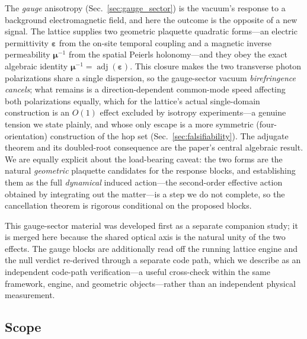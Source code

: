 The \emph{gauge} anisotropy (Sec.~\ref{sec:gauge_sector}) is the vacuum's response to
a background electromagnetic field, and here the outcome is the opposite of a new
signal. The lattice supplies two geometric plaquette quadratic forms---an electric
permittivity $\boldsymbol{\varepsilon}$ from the on-site temporal coupling and a
magnetic inverse permeability $\boldsymbol{\mu}^{-1}$ from the spatial Peierls
holonomy---and they obey the exact algebraic identity $\boldsymbol{\mu}^{-1} =
\operatorname{adj}(\boldsymbol{\varepsilon})$. This closure makes the two transverse
photon polarizations share a single dispersion, so the gauge-sector vacuum
\emph{birefringence cancels}; what remains is a direction-dependent common-mode speed
affecting both polarizations equally, which for the lattice's actual single-domain
construction is an $O(1)$ effect excluded by isotropy experiments---a genuine tension we
state plainly, and whose only escape is a more symmetric (four-orientation) construction
of the hop set (Sec.~\ref{sec:falsifiability}). The adjugate theorem and its
doubled-root consequence are the paper's central algebraic result. We are equally explicit about the load-bearing caveat: the two forms are the
natural \emph{geometric} plaquette candidates for the response blocks, and
establishing them as the full \emph{dynamical} induced action---the second-order
effective action obtained by integrating out the matter---is a step we do not
complete, so the cancellation theorem is rigorous conditional on the proposed blocks.

This gauge-sector material was developed first as a separate companion study; it is
merged here because the shared optical axis is the natural unity of the two effects.
The gauge blocks are additionally read off the running lattice engine and the null
verdict re-derived through a separate code path, which we describe as an independent
code-path verification---a useful cross-check within the same framework, engine, and
geometric objects---rather than an independent physical measurement.

\subsection{Scope}
\label{subsec:scope}

